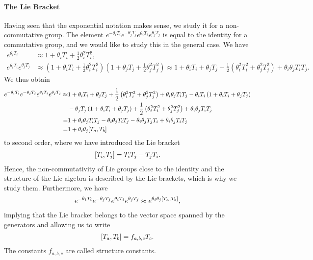 \paragraph{The Lie Bracket}
Having seen that the exponential notation makes sense, we study it for a non-commutative group. The element $e^{-\theta_{i}T_{i}}e^{-\theta_{j}T_{j}}e^{\theta_{i}T_{i}}e^{\theta_{j}T_{j}}$ is equal to the identity for a commutative group, and we would like to study this in the general case. We have
\begin{align*}
	e^{\theta_{i}T_{i}}                    &\approx 1 + \theta_{i}T_{i} + \frac{1}{2}\theta_{i}^{2}T_{i}^{2}, \\
	e^{\theta_{i}T_{i}}e^{\theta_{j}T_{j}} &\approx \left(1 + \theta_{i}T_{i} + \frac{1}{2}\theta_{i}^{2}T_{i}^{2}\right)\left(1 + \theta_{j}T_{j} + \frac{1}{2}\theta_{j}^{2}T_{j}^{2}\right) \approx 1 + \theta_{i}T_{i} + \theta_{j}T_{j} + \frac{1}{2}\left(\theta_{i}^{2}T_{i}^{2} + \theta_{j}^{2}T_{j}^{2}\right) + \theta_{i}\theta_{j}T_{i}T_{j}.
\end{align*}
We thus obtain
\begin{align*}
	e^{-\theta_{i}T_{i}}e^{-\theta_{j}T_{j}}e^{\theta_{i}T_{i}}e^{\theta_{j}T_{j}} \approx& 1 + \theta_{i}T_{i} + \theta_{j}T_{j} + \frac{1}{2}\left(\theta_{i}^{2}T_{i}^{2} + \theta_{j}^{2}T_{j}^{2}\right) + \theta_{i}\theta_{j}T_{i}T_{j} - \theta_{i}T_{i}\left(1 + \theta_{i}T_{i} + \theta_{j}T_{j}\right) \\
	 &- \theta_{j}T_{j}\left(1 + \theta_{i}T_{i} + \theta_{j}T_{j}\right) + \frac{1}{2}\left(\theta_{i}^{2}T_{i}^{2} + \theta_{j}^{2}T_{j}^{2}\right) + \theta_{i}\theta_{j}T_{i}T_{j} \\
	=& 1 + \theta_{i}\theta_{j}T_{i}T_{j} - \theta_{i}\theta_{j}T_{i}T_{j} - \theta_{i}\theta_{j}T_{j}T_{i} + \theta_{i}\theta_{j}T_{i}T_{j} \\
	=& 1 + \theta_{i}\theta_{j}\comm{T_{a}}{T_{b}}
\end{align*}
to second order, where we have introduced the Lie bracket
\begin{align*}
	\comm{T_{i}}{T_{j}} = T_{i}T_{j} - T_{j}T_{i}.
\end{align*}
Hence, the non-commutativity of Lie groups close to the identity and the structure of the Lie algebra is described by the Lie brackets, which is why we study them. Furthermore, we have
\begin{align*}
	e^{-\theta_{i}T_{i}}e^{-\theta_{j}T_{j}}e^{\theta_{i}T_{i}}e^{\theta_{j}T_{j}} \approx e^{\theta_{i}\theta_{j}\comm{T_{a}}{T_{b}}},
\end{align*}
implying that the Lie bracket belongs to the vector space spanned by the generators and allowing us to write
\begin{align*}
	\comm{T_{a}}{T_{b}} = f_{a, b, c}T_{c}.
\end{align*}
The constants $f_{a, b, c}$ are called structure constants.

